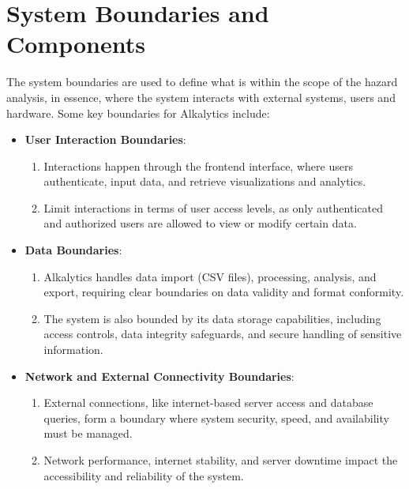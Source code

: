 \documentclass{article}
\begin{document}
\section{System Boundaries and Components} \label{sec3}
The system boundaries are used to define what is within the scope of the hazard analysis,
in essence, where the system interacts with external systems, users and hardware. Some key
boundaries for Alkalytics include:
\begin{itemize}
  \item \textbf{User Interaction Boundaries}:
    \begin{enumerate}
      \item Interactions happen through the frontend interface, where users authenticate, 
      input data, and retrieve visualizations and analytics.
      \item Limit interactions in terms of user access levels, as only authenticated and authorized users
      are allowed to view or modify certain data.
    \end{enumerate}
  \item \textbf{Data Boundaries}:
    \begin{enumerate}
      \item Alkalytics handles data import (CSV files), processing, analysis, and export, requiring clear 
      boundaries on data validity and format conformity.
      \item The system is also bounded by its data storage capabilities, including access controls, data integrity 
      safeguards, and secure handling of sensitive information.
    \end{enumerate}
  \item \textbf{Network and External Connectivity Boundaries}:
    \begin{enumerate}
      \item External connections, like internet-based server access and database queries, form a boundary where system 
      security, speed, and availability must be managed.
      \item Network performance, internet stability, and server downtime impact the accessibility and reliability of the system.
    \end{enumerate}
\end{itemize}
\end{document}
